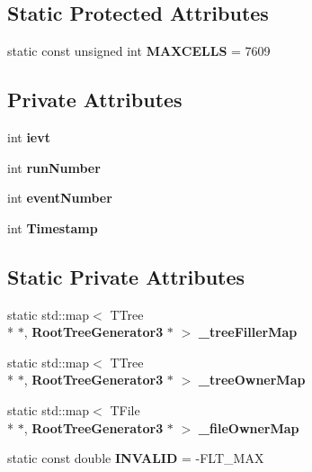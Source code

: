\subsection*{Static Protected Attributes}
\begin{DoxyCompactItemize}
\item 
static const unsigned int {\bfseries M\-A\-X\-C\-E\-L\-L\-S} = 7609\label{classCALICE_1_1RootTreeGenerator3_ab5afb056b4e112ca55da25fbcd13bddf}

\end{DoxyCompactItemize}
\subsection*{Private Attributes}
\begin{DoxyCompactItemize}
\item 
int {\bfseries ievt}\label{classCALICE_1_1RootTreeGenerator3_a38ebd481e4c45711638c39045182a090}

\item 
int {\bfseries run\-Number}\label{classCALICE_1_1RootTreeGenerator3_ac3a63c5110451b2f7c25f2870394b366}

\item 
int {\bfseries event\-Number}\label{classCALICE_1_1RootTreeGenerator3_a5ee1694157b036ac1b9b0b2fa6dd4f31}

\item 
int {\bfseries Timestamp}\label{classCALICE_1_1RootTreeGenerator3_afcacb608a22273864c315acbbd47e680}

\end{DoxyCompactItemize}
\subsection*{Static Private Attributes}
\begin{DoxyCompactItemize}
\item 
static std\-::map$<$ T\-Tree \\*
$\ast$, {\bf Root\-Tree\-Generator3} $\ast$ $>$ {\bfseries \-\_\-tree\-Filler\-Map}\label{classCALICE_1_1RootTreeGenerator3_aaff1fa336e4bdad0b8c53b2eabae7a7a}

\item 
static std\-::map$<$ T\-Tree \\*
$\ast$, {\bf Root\-Tree\-Generator3} $\ast$ $>$ {\bfseries \-\_\-tree\-Owner\-Map}\label{classCALICE_1_1RootTreeGenerator3_ac03ad28c9c5c1aabf480cc116f2b1a08}

\item 
static std\-::map$<$ T\-File \\*
$\ast$, {\bf Root\-Tree\-Generator3} $\ast$ $>$ {\bfseries \-\_\-file\-Owner\-Map}\label{classCALICE_1_1RootTreeGenerator3_a3ae960ab337dc179d5e62407b172ace7}

\item 
static const double {\bfseries I\-N\-V\-A\-L\-I\-D} = -\/F\-L\-T\-\_\-\-M\-A\-X\label{classCALICE_1_1RootTreeGenerator3_a08a34f6003acb82140e27427937ed6d1}

\end{DoxyCompactItemize}


